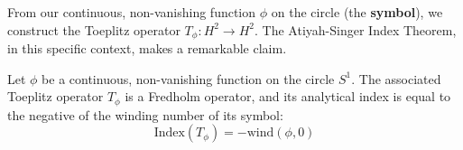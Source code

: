 From our continuous, non-vanishing function $\phi$ on the circle (the \textbf{symbol}), we construct the Toeplitz operator $T_\phi: H^2 \to H^2$.
The Atiyah-Singer Index Theorem, in this specific context, makes a remarkable claim.

\begin{theorem}
Let $\phi$ be a continuous, non-vanishing function on the circle $S^1$. The associated Toeplitz operator $T_\phi$ is a Fredholm operator, and its analytical index is equal to the negative of the winding number of its symbol:
\begin{equation}
    \text{Index}(T_\phi) = -\text{wind}(\phi, 0)
    \label{eq:toeplitz_index_theorem}
\end{equation}
\end{theorem}

